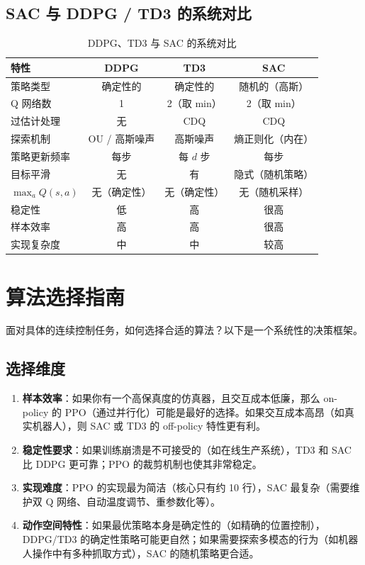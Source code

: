 \subsection{SAC 与 DDPG / TD3 的系统对比}

\begin{table}[H]
\centering
\caption{DDPG、TD3 与 SAC 的系统对比}
\begin{tabular}{@{}lccc@{}}
\toprule
\textbf{特性} & \textbf{DDPG} & \textbf{TD3} & \textbf{SAC} \\
\midrule
策略类型 & 确定性的 & 确定性的 & 随机的（高斯） \\
Q 网络数 & 1 & 2（取 min） & 2（取 min） \\
过估计处理 & 无 & CDQ & CDQ \\
探索机制 & OU / 高斯噪声 & 高斯噪声 & 熵正则化（内在） \\
策略更新频率 & 每步 & 每 $d$ 步 & 每步 \\
目标平滑 & 无 & 有 & 隐式（随机策略） \\
$\max_a Q(s,a)$ & 无（确定性） & 无（确定性） & 无（随机采样） \\
稳定性 & 低 & 高 & 很高 \\
样本效率 & 高 & 高 & 很高 \\
实现复杂度 & 中 & 中 & 较高 \\
\bottomrule
\end{tabular}
\label{tab:algo_compare}
\end{table}

\section{算法选择指南}

面对具体的连续控制任务，如何选择合适的算法？以下是一个系统性的决策框架。

\subsection{选择维度}

\begin{enumerate}
    \item \textbf{样本效率}：如果你有一个高保真度的仿真器，且交互成本低廉，那么 on-policy 的 PPO（通过并行化）可能是最好的选择。如果交互成本高昂（如真实机器人），则 SAC 或 TD3 的 off-policy 特性更有利。
    
    \item \textbf{稳定性要求}：如果训练崩溃是不可接受的（如在线生产系统），TD3 和 SAC 比 DDPG 更可靠；PPO 的裁剪机制也使其非常稳定。
    
    \item \textbf{实现难度}：PPO 的实现最为简洁（核心只有约 10 行），SAC 最复杂（需要维护双 Q 网络、自动温度调节、重参数化等）。
    
    \item \textbf{动作空间特性}：如果最优策略本身是确定性的（如精确的位置控制），DDPG/TD3 的确定性策略可能更自然；如果需要探索多模态的行为（如机器人操作中有多种抓取方式），SAC 的随机策略更合适。
\end{enumerate}

